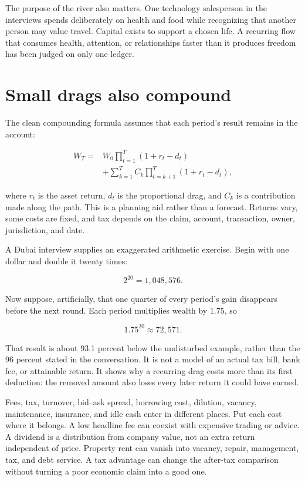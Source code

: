The purpose of the river also matters. One technology salesperson in the
interviews spends deliberately on health and food while recognizing that
another person may value travel. Capital exists to support a chosen life. A
recurring flow that consumes health, attention, or relationships faster than
it produces freedom has been judged on only one ledger.

\section{Small drags also compound}

The clean compounding formula assumes that each period's result remains in the
account:

\begin{equation}
\begin{aligned}
W_T={}&W_0\prod_{t=1}^{T}(1+r_t-d_t)\\
&+\sum_{k=1}^{T}C_k\prod_{t=k+1}^{T}(1+r_t-d_t),
\end{aligned}
\end{equation}

where \(r_t\) is the asset return, \(d_t\) is the proportional drag, and
\(C_k\) is a contribution made along the path. This is a planning aid rather
than a forecast. Returns vary, some costs are fixed, and tax depends on the
claim, account, transaction, owner, jurisdiction, and date.

A Dubai interview supplies an exaggerated arithmetic exercise. Begin with one
dollar and double it twenty times:

\begin{equation}
2^{20}=1{,}048{,}576.
\end{equation}

Now suppose, artificially, that one quarter of every period's gain disappears
before the next round. Each period multiplies wealth by \(1.75\), so

\begin{equation}
1.75^{20}\approx72{,}571.
\end{equation}

That result is about 93.1 percent below the undisturbed example, rather than
the 96 percent stated in the conversation. It is not a model of an actual tax
bill, bank fee, or attainable return. It shows why a recurring drag costs more
than its first deduction: the removed amount also loses every later return it
could have earned.

Fees, tax, turnover, bid--ask spread, borrowing cost, dilution, vacancy,
maintenance, insurance, and idle cash enter in different places. Put each cost
where it belongs. A low headline fee can coexist with expensive trading or
advice. A dividend is a distribution from company value, not an extra return
independent of price. Property rent can vanish into vacancy, repair,
management, tax, and debt service. A tax advantage can change the after-tax
comparison without turning a poor economic claim into a good one.

